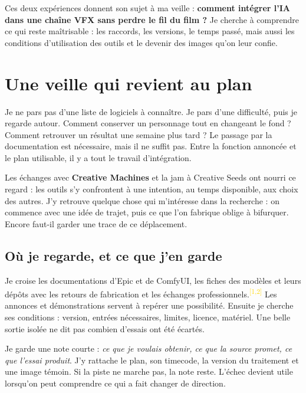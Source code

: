 \documentclass[11pt,a4paper]{article}
\newcommand{\src}[1]{\textsuperscript{\textcolor{gold}{[#1]}}}
\begin{document}
Ces deux expériences donnent son sujet à ma veille : \textbf{comment intégrer l'IA dans une chaîne VFX sans perdre le fil du film ?} Je cherche à comprendre ce qui reste maîtrisable : les raccords, les versions, le temps passé, mais aussi les conditions d'utilisation des outils et le devenir des images qu'on leur confie.
\newpage
\section{Une veille qui revient au plan}
Je ne pars pas d'une liste de logiciels à connaître. Je pars d'une difficulté, puis je regarde autour. Comment conserver un personnage tout en changeant le fond ? Comment retrouver un résultat une semaine plus tard ? Le passage par la documentation est nécessaire, mais il ne suffit pas. Entre la fonction annoncée et le plan utilisable, il y a tout le travail d'intégration.

Les échanges avec \textbf{Creative Machines} et la jam à Creative Seeds ont nourri ce regard : les outils s'y confrontent à une intention, au temps disponible, aux choix des autres. J'y retrouve quelque chose qui m'intéresse dans la recherche : on commence avec une idée de trajet, puis ce que l'on fabrique oblige à bifurquer. Encore faut-il garder une trace de ce déplacement.

\subsection{Où je regarde, et ce que j'en garde}
Je croise les documentations d'Epic et de ComfyUI, les fiches des modèles et leurs dépôts avec les retours de fabrication et les échanges professionnels.\src{1,2} Les annonces et démonstrations servent à repérer une possibilité. Ensuite je cherche ses conditions : version, entrées nécessaires, limites, licence, matériel. Une belle sortie isolée ne dit pas combien d'essais ont été écartés.

Je garde une note courte : \emph{ce que je voulais obtenir, ce que la source promet, ce que l'essai produit}. J'y rattache le plan, son timecode, la version du traitement et une image témoin. Si la piste ne marche pas, la note reste. L'échec devient utile lorsqu'on peut comprendre ce qui a fait changer de direction.
\end{document}
